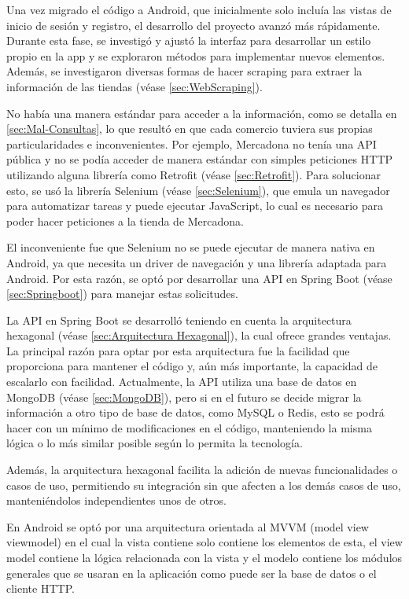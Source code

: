 \documentclass[12pt,twoside,titlepage]{report}
\begin{document}
Una vez migrado el código a Android, que inicialmente solo incluía las vistas de inicio de sesión y registro, el desarrollo del proyecto avanzó más rápidamente. Durante esta fase, se investigó y ajustó la interfaz para desarrollar un estilo propio en la app y se exploraron métodos para implementar nuevos elementos. Además, se investigaron diversas formas de hacer scraping para extraer la información de las tiendas (véase \ref{sec:WebScraping}).

No había una manera estándar para acceder a la información, como se detalla en \ref{sec:Mal-Consultas}, lo que resultó en que cada comercio tuviera sus propias particularidades e inconvenientes. Por ejemplo, Mercadona no tenía una API pública y no se podía acceder de manera estándar con simples peticiones HTTP utilizando alguna librería como Retrofit (véase \ref{sec:Retrofit}). Para solucionar esto, se usó la librería Selenium (véase \ref{sec:Selenium}), que emula un navegador para automatizar tareas y puede ejecutar JavaScript, lo cual es necesario para poder hacer peticiones a la tienda de Mercadona.

El inconveniente fue que Selenium no se puede ejecutar de manera nativa en Android, ya que necesita un driver de navegación y una librería adaptada para Android. Por esta razón, se optó por desarrollar una API en Spring Boot (véase \ref{sec:Springboot}) para manejar estas solicitudes.

La API en Spring Boot se desarrolló teniendo en cuenta la arquitectura hexagonal (véase \ref{sec:Arquitectura Hexagonal}), la cual ofrece grandes ventajas. La principal razón para optar por esta arquitectura fue la facilidad que proporciona para mantener el código y, aún más importante, la capacidad de escalarlo con facilidad. Actualmente, la API utiliza una base de datos en MongoDB (véase \ref{sec:MongoDB}), pero si en el futuro se decide migrar la información a otro tipo de base de datos, como MySQL o Redis, esto se podrá hacer con un mínimo de modificaciones en el código, manteniendo la misma lógica o lo más similar posible según lo permita la tecnología.

Además, la arquitectura hexagonal facilita la adición de nuevas funcionalidades o casos de uso, permitiendo su integración sin que afecten a los demás casos de uso, manteniéndolos independientes unos de otros.

En Android se optó por una arquitectura orientada al MVVM (model view viewmodel) en el cual la vista contiene solo contiene los elementos de esta, el view model contiene la lógica relacionada con la vista y el modelo contiene los módulos generales que se usaran en la aplicación como puede ser la base de datos o el cliente HTTP.
\end{document}
